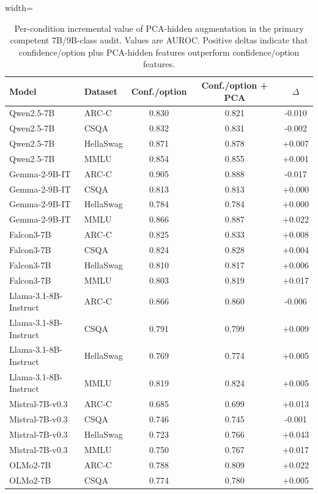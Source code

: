 
\begin{table}[t]
\centering
\scriptsize
\caption{Per-condition incremental value of PCA-hidden augmentation in the primary competent 7B/9B-class audit. Values are AUROC. Positive deltas indicate that confidence/option plus PCA-hidden features outperform confidence/option features.}
\label{tab:per-condition-deltas}
\begin{threeparttable}
\begin{adjustbox}{width=\textwidth}
\begin{tabular}{llccc}
\toprule
Model & Dataset & Conf./option & Conf./option + PCA & $\Delta$ \\
\midrule
Qwen2.5-7B & ARC-C & 0.830 & 0.821 & -0.010 \\
Qwen2.5-7B & CSQA & 0.832 & 0.831 & -0.002 \\
Qwen2.5-7B & HellaSwag & 0.871 & 0.878 & +0.007 \\
Qwen2.5-7B & MMLU & 0.854 & 0.855 & +0.001 \\
Gemma-2-9B-IT & ARC-C & 0.905 & 0.888 & -0.017 \\
Gemma-2-9B-IT & CSQA & 0.813 & 0.813 & +0.000 \\
Gemma-2-9B-IT & HellaSwag & 0.784 & 0.784 & +0.000 \\
Gemma-2-9B-IT & MMLU & 0.866 & 0.887 & +0.022 \\
Falcon3-7B & ARC-C & 0.825 & 0.833 & +0.008 \\
Falcon3-7B & CSQA & 0.824 & 0.828 & +0.004 \\
Falcon3-7B & HellaSwag & 0.810 & 0.817 & +0.006 \\
Falcon3-7B & MMLU & 0.803 & 0.819 & +0.017 \\
Llama-3.1-8B-Instruct & ARC-C & 0.866 & 0.860 & -0.006 \\
Llama-3.1-8B-Instruct & CSQA & 0.791 & 0.799 & +0.009 \\
Llama-3.1-8B-Instruct & HellaSwag & 0.769 & 0.774 & +0.005 \\
Llama-3.1-8B-Instruct & MMLU & 0.819 & 0.824 & +0.005 \\
Mistral-7B-v0.3 & ARC-C & 0.685 & 0.699 & +0.013 \\
Mistral-7B-v0.3 & CSQA & 0.746 & 0.745 & -0.001 \\
Mistral-7B-v0.3 & HellaSwag & 0.723 & 0.766 & +0.043 \\
Mistral-7B-v0.3 & MMLU & 0.750 & 0.767 & +0.017 \\
OLMo2-7B & ARC-C & 0.788 & 0.809 & +0.022 \\
OLMo2-7B & CSQA & 0.774 & 0.780 & +0.005 \\

\end{tabular}
\end{adjustbox}
\end{threeparttable}
\end{table}
